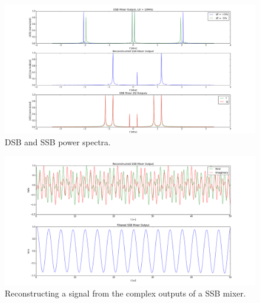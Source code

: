 \documentclass[11pt]{article}
\begin{document}
    \begin{figure}[H]
        \centering
            \includegraphics[width = \textwidth]{2_2_2_dsb_ssb_freq.png}
        \caption{DSB and SSB power spectra.}
        \label{sbfreq}
    \end{figure}

    \begin{figure}[H]
        \centering
            \includegraphics[width = \textwidth]{2_2_2_ssb_time.png}
        \caption{Reconstructing a signal from the complex outputs of a SSB mixer.}
        \label{ssbtime}
    \end{figure}
\end{document}
